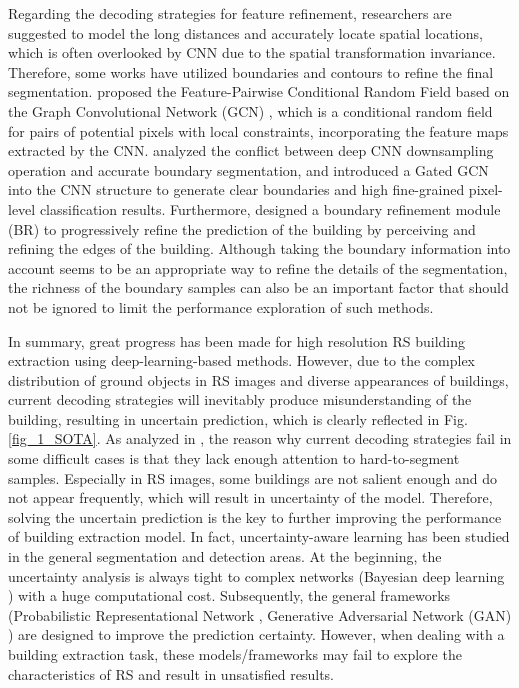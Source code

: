 \documentclass[lettersize,journal]{IEEEtran}
\begin{document}
\par
Regarding the decoding strategies for feature refinement, researchers are suggested to model the long distances and accurately locate spatial locations, which is often overlooked by CNN due to the spatial transformation invariance. Therefore, some works have utilized boundaries and contours to refine the final segmentation. \cite{FPCRF} proposed the Feature-Pairwise Conditional Random Field based on the Graph Convolutional Network (GCN) \cite{GNN}, which is a conditional random field for pairs of potential pixels with local constraints, incorporating the feature maps extracted by the CNN. \cite{gatedGCN_boundary} analyzed the conflict between deep CNN downsampling operation and accurate boundary segmentation, and introduced a Gated GCN into the CNN structure to generate clear boundaries and high fine-grained pixel-level classification results. Furthermore, \cite{CBRNet} designed a boundary refinement module (BR) to progressively refine the prediction of the building by perceiving and refining the edges of the building. Although taking the boundary information into account seems to be an appropriate way to refine the details of the segmentation, the richness of the boundary samples can also be an important factor that should not be ignored to limit the performance exploration of such methods.

\par
In summary, great progress has been made for high resolution RS building extraction using deep-learning-based methods. However, due to the complex distribution of ground objects in RS images and diverse appearances of buildings, current decoding strategies will inevitably produce misunderstanding of the building, resulting in uncertain prediction, which is clearly reflected in Fig. \ref{fig_1_SOTA}.
As analyzed in \cite{What_uncertainties}, the reason why current decoding strategies fail in some difficult cases is that they lack enough attention to hard-to-segment samples. Especially in RS images, some buildings are not salient enough and do not appear frequently, which will result in uncertainty of the model.
Therefore, solving the uncertain prediction is the key to further improving the performance of building extraction model.
In fact, uncertainty-aware learning has been studied in the general segmentation \cite{Phiseg,Assessing_reliability,UGTR} and detection \cite{kraus2019uncertainty} areas. 
At the beginning, the uncertainty analysis is always tight to complex networks (Bayesian deep learning \cite{What_uncertainties,bayesian_uncertainty} ) with a huge computational cost.
Subsequently, the general frameworks (Probabilistic Representational Network \cite{UDNet,UGTR}, Generative Adversarial Network (GAN) ) are designed to improve the prediction certainty.
However, when dealing with a building extraction task,
these models/frameworks may fail to explore the characteristics of RS and result in unsatisfied results. 
\end{document}
